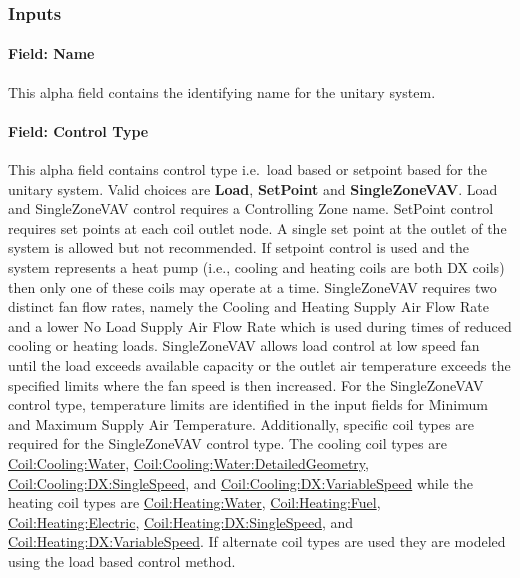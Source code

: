 \subsubsection{Inputs}\label{inputs-049}

\paragraph{Field: Name}\label{field-name-048}

This alpha field contains the identifying name for the unitary system.

\paragraph{Field: Control Type}\label{field-control-type-004}

This alpha field contains control type i.e.~load based or setpoint based for the unitary system. Valid choices are \textbf{Load}, \textbf{SetPoint} and \textbf{SingleZoneVAV}. Load and SingleZoneVAV control requires a Controlling Zone name. SetPoint control requires set points at each coil outlet node. A single set point at the outlet of the system is allowed but not recommended. If setpoint control is used and the system represents a heat pump (i.e., cooling and heating coils are both DX coils) then only one of these coils may operate at a time. SingleZoneVAV requires two distinct fan flow rates, namely the Cooling and Heating Supply Air Flow Rate and a lower No Load Supply Air Flow Rate which is used during times of reduced cooling or heating loads. SingleZoneVAV allows load control at low speed fan until the load exceeds available capacity or the outlet air temperature exceeds the specified limits where the fan speed is then increased. For the SingleZoneVAV control type, temperature limits are identified in the input fields for Minimum and Maximum Supply Air Temperature. Additionally, specific coil types are required for the SingleZoneVAV control type. The cooling coil types are \hyperref[coilcoolingwater]{Coil:Cooling:Water}, \hyperref[coilcoolingwaterdetailedgeometry]{Coil:Cooling:Water:DetailedGeometry}, \hyperref[coilcoolingdxsinglespeed]{Coil:Cooling:DX:SingleSpeed}, and \hyperref[coilcoolingdxvariablespeed]{Coil:Cooling:DX:VariableSpeed} while the heating coil types are \hyperref[coilheatingwater]{Coil:Heating:Water}, \hyperref[coilheatinggas-000]{Coil:Heating:Fuel}, \hyperref[coilheatingelectric]{Coil:Heating:Electric}, \hyperref[coilheatingdxsinglespeed]{Coil:Heating:DX:SingleSpeed}, and \hyperref[coilheatingdxvariablespeed]{Coil:Heating:DX:VariableSpeed}. If alternate coil types are used they are modeled using the load based control method.

